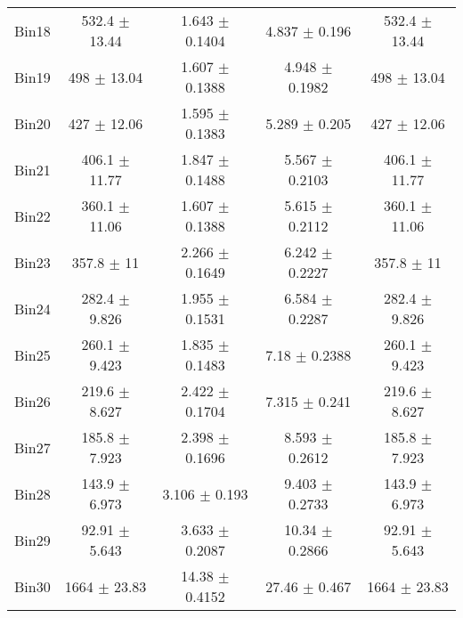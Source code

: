 \begin{tabular}{@{\extracolsep{4pt}}lcccc@{}}
     Bin18 & 532.4 $\pm$ 13.44 & 1.643 $\pm$ 0.1404 & 4.837 $\pm$ 0.196 & 532.4 $\pm$ 13.44 \\ 
     Bin19 & 498 $\pm$ 13.04 & 1.607 $\pm$ 0.1388 & 4.948 $\pm$ 0.1982 & 498 $\pm$ 13.04 \\ 
     Bin20 & 427 $\pm$ 12.06 & 1.595 $\pm$ 0.1383 & 5.289 $\pm$ 0.205 & 427 $\pm$ 12.06 \\ 
     Bin21 & 406.1 $\pm$ 11.77 & 1.847 $\pm$ 0.1488 & 5.567 $\pm$ 0.2103 & 406.1 $\pm$ 11.77 \\ 
     Bin22 & 360.1 $\pm$ 11.06 & 1.607 $\pm$ 0.1388 & 5.615 $\pm$ 0.2112 & 360.1 $\pm$ 11.06 \\ 
     Bin23 & 357.8 $\pm$ 11 & 2.266 $\pm$ 0.1649 & 6.242 $\pm$ 0.2227 & 357.8 $\pm$ 11 \\ 
     Bin24 & 282.4 $\pm$ 9.826 & 1.955 $\pm$ 0.1531 & 6.584 $\pm$ 0.2287 & 282.4 $\pm$ 9.826 \\ 
     Bin25 & 260.1 $\pm$ 9.423 & 1.835 $\pm$ 0.1483 & 7.18 $\pm$ 0.2388 & 260.1 $\pm$ 9.423 \\ 
     Bin26 & 219.6 $\pm$ 8.627 & 2.422 $\pm$ 0.1704 & 7.315 $\pm$ 0.241 & 219.6 $\pm$ 8.627 \\ 
     Bin27 & 185.8 $\pm$ 7.923 & 2.398 $\pm$ 0.1696 & 8.593 $\pm$ 0.2612 & 185.8 $\pm$ 7.923 \\ 
     Bin28 & 143.9 $\pm$ 6.973 & 3.106 $\pm$ 0.193 & 9.403 $\pm$ 0.2733 & 143.9 $\pm$ 6.973 \\ 
     Bin29 & 92.91 $\pm$ 5.643 & 3.633 $\pm$ 0.2087 & 10.34 $\pm$ 0.2866 & 92.91 $\pm$ 5.643 \\ 
     Bin30 & 1664 $\pm$ 23.83 & 14.38 $\pm$ 0.4152 & 27.46 $\pm$ 0.467 & 1664 $\pm$ 23.83 \\ 
\hline\hline
  \end{tabular}
